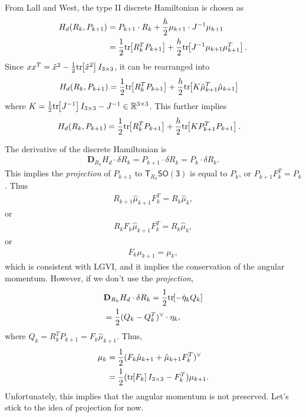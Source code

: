 \documentclass[letterpaper, 10pt, conference]{ieeeconf}
\newcommand{\bracket}[1]{\ensuremath{\left[ #1 \right]}}
\newcommand{\tr}[1]{\mbox{tr}\ensuremath{\negthickspace\bracket{#1}}}
\newcommand{\SO}{\ensuremath{\mathsf{SO(3)}}}
\newcommand{\T}{\ensuremath{\mathsf{T}}}
\renewcommand{\Re}{\ensuremath{\mathbb{R}}}
\newcommand{\D}{\ensuremath{\mathbf{D}}}
\begin{document}
From Lall and West, the type II discrete Hamiltonian is chosen as
\begin{align*}
    H_d (R_k, P_{k+1}) 
    & = P_{k+1} \cdot R_k   + \frac{h}{2} \mu_{k+1} \cdot J^{-1} \mu_{k+1}\\
    & = \frac{1}{2}\tr{R_k^T P_{k+1}}   + \frac{h}{2} \tr{ J^{-1} \mu_{k+1}\mu_{k+1}^T}.
\end{align*}
Since $xx^T = \hat x^2 -\frac{1}{2}\tr{\hat x^2}I_{3\times 3}$, it can be rearranged into
\begin{align*}
    H_d (R_k, P_{k+1}) 
     & = \frac{1}{2}\tr{R_k^T P_{k+1}}   + \frac{h}{2} \tr{ K \hat \mu_{k+1}^T \hat \mu_{k+1}} 
\end{align*}
where $K = \frac{1}{2}\tr{J^{-1}} I_{3\times 3}-J^{-1} \in\Re^{3\times 3} $.
This further implies
\begin{align}
    H_d (R_k, P_{k+1}) 
     & = \frac{1}{2}\tr{R_k^T P_{k+1}}   + \frac{h}{2} \tr{ K P_{k+1}^T P_{k+1}}.
\end{align}

The derivative of the discrete Hamiltonian is
\begin{align*}
    \D_{R_k} H_d \cdot \delta R_k = P_{k+1} \cdot \delta R_k = P_k \cdot \delta R_k.
\end{align*}
This implies the \textit{projection} of $P_{k+1}$ to $\T_{R_k} \SO$ is equal to $P_k$, or $P_{k+1} F_k^T = P_k$. 
Thus
\begin{align*}
    R_{k+1} \hat \mu_{k+1} F_k^T = R_k \hat \mu_k,
\end{align*}
or
\begin{align*}
    R_k F_k  \hat\mu_{k+1} F_k^T = R_k \hat \mu_k,
\end{align*}
or
\begin{align}
    F_k \mu_{k+1} = \mu_k,
\end{align}
which is consistent with LGVI, and it implies the conservation of the angular momentum.
However, if we don't use the \textit{projection},
\begin{align*}
    & \D_{R_k} H_d \cdot \delta R_k 
    =\frac{1}{2} \tr{-\hat\eta_k Q_k} \\
    & = \frac{1}{2} ( Q_k- Q_k^T )^\vee\cdot \eta_k,
\end{align*}
where $Q_k = R_k^T P_{k+1} = F_k \hat\mu_{k+1}$.
Thus,
\begin{align*}
    \mu_k 
          & = \frac{1}{2} (F_k\hat\mu_{k+1}+\hat\mu_{k+1}F_k^T )^\vee\nonumber \\
          & = \frac{1}{2}(\tr{F_k}I_{3\times 3}-F_k^T)  \mu_{k+1}.
\end{align*}
Unfortunately, this implies that the angular momentum is not preserved. 
Let's stick to the idea of projection for now. 
\end{document}
